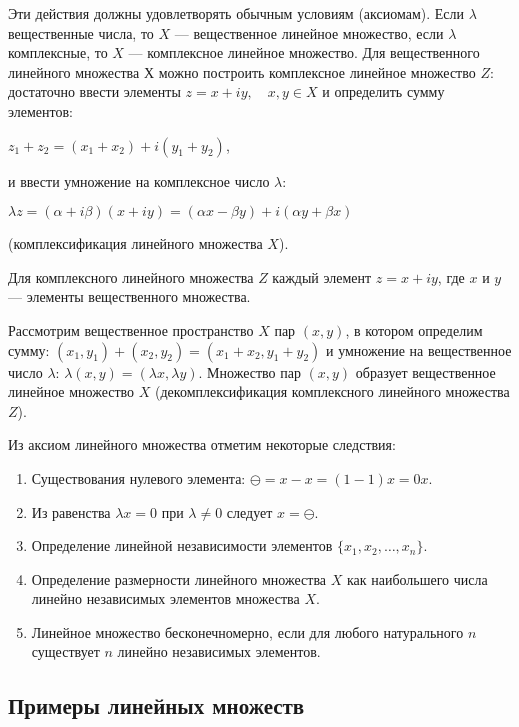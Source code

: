 \documentclass[12pt,a4paper,titlepage]{book}
\theoremstyle{definition}
\theoremstyle{plain}
\theoremstyle{remark}
\theoremstyle{remark}
\theoremstyle{remark}
\theoremstyle{plain}
\begin{document}
Эти действия должны удовлетворять обычным условиям (аксиомам). Если $\lambda$ вещественные числа, то $X$ --- вещественное линейное множество, если $\lambda$ комплексные, то $X$ --- комплексное линейное множество. Для вещественного линейного множества $Х$ можно построить комплексное линейное множество $Z$: достаточно ввести элементы $z=x+iy,\quad x,y \in X$ и определить сумму элементов:

\begin{center}
$z_1+z_2=(x_1+x_2)+i(y_1+y_2)$,
\end{center}
и ввести умножение на комплексное число $\lambda$:
\begin{center}
$\lambda z = (\alpha + i\beta)(x+iy) = (\alpha x - \beta y)+i(\alpha y + \beta x)$
\end{center}
(комплексификация линейного множества $X$).

Для комплексного линейного множества $Z$ каждый элемент $z=x+iy$, где $x$ и $y$ --- элементы вещественного множества.

Рассмотрим вещественное пространство $X$ пар $(x,y)$, в котором определим сумму: $(x_1,y_1)+(x_2,y_2) = (x_1+x_2,y_1+y_2)$ и умножение на вещественное число $\lambda$: $\lambda(x,y) = (\lambda x, \lambda y)$. Множество пар $(x,y)$ образует вещественное линейное множество  $X$ (декомплексификация комплексного линейного множества $Z$).

Из аксиом линейного множества отметим некоторые следствия:

\begin{enumerate}

	\item Существования нулевого элемента: $\ominus=x-x=(1-1)x=0x$.

	\item Из равенства $\lambda x=0$ при $\lambda\ne0$ следует $x=\ominus$.

	\item Определение линейной независимости элементов $\{x_1,x_2,\dotsc,x_n\}$.

	\item Определение размерности линейного множества $X$ как наибольшего числа линейно независимых элементов множества $X$.

	\item Линейное множество бесконечномерно, если для любого натурального $n$ существует $n$ линейно независимых элементов.

\end{enumerate}

\subsection*{Примеры линейных множеств}
\end{document}
